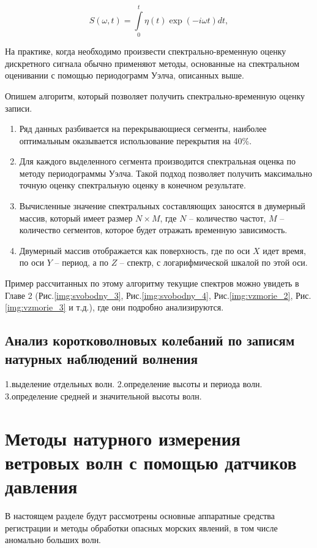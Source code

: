 \begin{equation}\label{eq:currSpectr}
  S(\omega,t)=\int\limits^{t}_0\eta(t)\exp(-i\omega t)dt,
\end{equation}

На практике, когда необходимо произвести спектрально-временную оценку дискретного сигнала обычно применяют методы, основанные на спектральном оценивании с помощью периодограмм Уэлча, описанных выше.

Опишем алгоритм, который позволяет получить спектрально-временную оценку записи.
\begin{enumerate}
  \item Ряд данных разбивается на перекрывающиеся сегменты, наиболее оптимальным оказывается использование перекрытия на 40\%.
  \item Для каждого выделенного сегмента производится спектральная оценка по методу периодограммы Уэлча. Такой подход позволяет получить максимально точную оценку спектральную оценку в конечном результате.
  \item Вычисленные значение спектральных составляющих заносятся в двумерный массив, который имеет размер $N\times M$, где $N$ -- количество частот, $M$ -- количество сегментов, которое будет отражать временную зависимость.
  \item Двумерный массив отображается как поверхность, где по оси $X$ идет время, по оси $Y$ – период, а по $Z$ – спектр, с логарифмической шкалой по этой оси.
\end{enumerate}
Пример рассчитанных по этому алгоритму текущие спектров можно увидеть в Главе 2 (Рис.\ref{img:svobodny_3}, Рис.\ref{img:svobodny_4}, Рис.\ref{img:vzmorie_2}, Рис.\ref{img:vzmorie_3} и т.д.), где они подробно анализируются.

\subsection{Анализ коротковолновых колебаний по записям натурных наблюдений волнения}

\textcolor[rgb]{1.00,0.00,0.00}{1.выделение отдельных волн. 2.определение высоты и периода волн. 3.определение  средней и значительной высоты волн.}


\section{Методы натурного измерения ветровых волн с помощью датчиков давления}
В настоящем разделе будут рассмотрены основные аппаратные средства регистрации и методы обработки опасных морских явлений, в том числе аномально больших волн.


